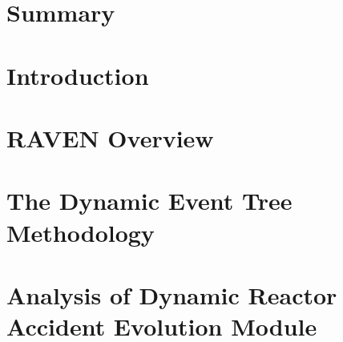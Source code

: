 \documentclass[pdf,ps2pdf,12pt]{INLreport}
\begin{document}
    \clearpage
    \section*{Summary}
    




    \SANDmain		%

    \section{Introduction}
    
    
    \section{RAVEN Overview}
    

    \section{The Dynamic Event Tree Methodology}
   

    \section{Analysis of Dynamic Reactor Accident Evolution Module}
   
\end{document}
